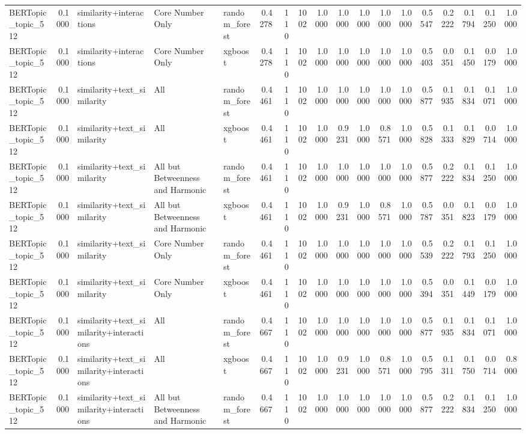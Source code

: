 \begin{tabular}{lrlllrrrrrrrrrrrrr}
BERTopic_topic_512 & 0.1000 & similarity+interactions & Core Number Only & random_forest & 0.4278 & 110 & 1002 & 1.0000 & 1.0000 & 1.0000 & 1.0000 & 1.0000 & 0.5547 & 0.2222 & 0.1794 & 0.1250 & 1.0000 \\
BERTopic_topic_512 & 0.1000 & similarity+interactions & Core Number Only & xgboost & 0.4278 & 110 & 1002 & 1.0000 & 1.0000 & 1.0000 & 1.0000 & 1.0000 & 0.5403 & 0.0351 & 0.1450 & 0.0179 & 1.0000 \\
BERTopic_topic_512 & 0.1000 & similarity+text_similarity & All & random_forest & 0.4461 & 110 & 1002 & 1.0000 & 1.0000 & 1.0000 & 1.0000 & 1.0000 & 0.5877 & 0.1935 & 0.1834 & 0.1071 & 1.0000 \\
BERTopic_topic_512 & 0.1000 & similarity+text_similarity & All & xgboost & 0.4461 & 110 & 1002 & 1.0000 & 0.9231 & 1.0000 & 0.8571 & 1.0000 & 0.5828 & 0.1333 & 0.1829 & 0.0714 & 1.0000 \\
BERTopic_topic_512 & 0.1000 & similarity+text_similarity & All but Betweenness and Harmonic & random_forest & 0.4461 & 110 & 1002 & 1.0000 & 1.0000 & 1.0000 & 1.0000 & 1.0000 & 0.5877 & 0.2222 & 0.1834 & 0.1250 & 1.0000 \\
BERTopic_topic_512 & 0.1000 & similarity+text_similarity & All but Betweenness and Harmonic & xgboost & 0.4461 & 110 & 1002 & 1.0000 & 0.9231 & 1.0000 & 0.8571 & 1.0000 & 0.5787 & 0.0351 & 0.1823 & 0.0179 & 1.0000 \\
BERTopic_topic_512 & 0.1000 & similarity+text_similarity & Core Number Only & random_forest & 0.4461 & 110 & 1002 & 1.0000 & 1.0000 & 1.0000 & 1.0000 & 1.0000 & 0.5539 & 0.2222 & 0.1793 & 0.1250 & 1.0000 \\
BERTopic_topic_512 & 0.1000 & similarity+text_similarity & Core Number Only & xgboost & 0.4461 & 110 & 1002 & 1.0000 & 1.0000 & 1.0000 & 1.0000 & 1.0000 & 0.5394 & 0.0351 & 0.1449 & 0.0179 & 1.0000 \\
BERTopic_topic_512 & 0.1000 & similarity+text_similarity+interactions & All & random_forest & 0.4667 & 110 & 1002 & 1.0000 & 1.0000 & 1.0000 & 1.0000 & 1.0000 & 0.5877 & 0.1935 & 0.1834 & 0.1071 & 1.0000 \\
BERTopic_topic_512 & 0.1000 & similarity+text_similarity+interactions & All & xgboost & 0.4667 & 110 & 1002 & 1.0000 & 0.9231 & 1.0000 & 0.8571 & 1.0000 & 0.5795 & 0.1311 & 0.1750 & 0.0714 & 0.8000 \\
BERTopic_topic_512 & 0.1000 & similarity+text_similarity+interactions & All but Betweenness and Harmonic & random_forest & 0.4667 & 110 & 1002 & 1.0000 & 1.0000 & 1.0000 & 1.0000 & 1.0000 & 0.5877 & 0.2222 & 0.1834 & 0.1250 & 1.0000 \\

\end{tabular}
